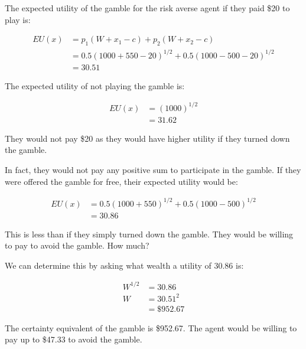 \documentclass[
  letterpaper,
  DIV=11,
  numbers=noendperiod]{scrreprt}
\begin{document}
\begin{tcolorbox}[enhanced jigsaw, title=\textcolor{quarto-callout-tip-color}{\faLightbulb}\hspace{0.5em}{Answer}, toprule=.15mm, colback=white, breakable, titlerule=0mm, colframe=quarto-callout-tip-color-frame, coltitle=black, opacityback=0, rightrule=.15mm, colbacktitle=quarto-callout-tip-color!10!white, bottomtitle=1mm, opacitybacktitle=0.6, arc=.35mm, bottomrule=.15mm, toptitle=1mm, leftrule=.75mm, left=2mm]

The expected utility of the gamble for the risk averse agent if they
paid \$20 to play is:

\begin{align*}
EU(x)&=p_1(W+x_1-c)+p_2(W+x_2-c) \\[6pt]
&=0.5(1000+550-20)^{1/2}+0.5(1000-500-20)^{1/2} \\[6pt]
&=30.51
\end{align*}

The expected utility of not playing the gamble is:

\begin{align*}
EU(x)&=(1000)^{1/2} \\[6pt]
&=31.62
\end{align*}

They would not pay \$20 as they would have higher utility if they turned
down the gamble.

In fact, they would not pay any positive sum to participate in the
gamble. If they were offered the gamble for free, their expected utility
would be:

\begin{align*}
EU(x)&=0.5(1000+550)^{1/2}+0.5(1000-500)^{1/2} \\[6pt]
&=30.86
\end{align*}

This is less than if they simply turned down the gamble. They would be
willing to pay to avoid the gamble. How much?

We can determine this by asking what wealth a utility of 30.86 is:

\begin{align*}
W^{1/2}&=30.86 \\[6pt]
W&=30.51^2 \\[6pt]
&=\$952.67
\end{align*}

The certainty equivalent of the gamble is \$952.67. The agent would be
willing to pay up to \$47.33 to avoid the gamble.

\end{tcolorbox}
\end{document}
